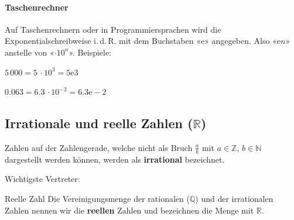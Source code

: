 

\paragraph{Taschenrechner} Auf Taschenrechnern oder in
Programmiersprachen wird die Exponentialschreibweise i.\,d.\,R. mit dem
Buchstaben «e» angegeben. Also «e$n$» anstelle von «$\cdot10^{n}$». Beispiele:

$5\,000 = 5\, \cdot 10^{3} = 5\mathrm{e}3$

$0.063 = 6.3\, \cdot 10^{-2} = 6.3\mathrm{e-}2$

\newpage

\subsection{Irrationale und reelle Zahlen ($\mathbb{R}$)}

  Zahlen auf der Zahlengerade, welche nicht als Bruch $\frac{a}{b}$ mit $a\in\mathbb{Z}$, $b \in \mathbb{N}$ dargestellt werden können, werden als \textbf{irrational} bezeichnet.

Wichtigste Vertreter:

\begin{center}
\end{center}

\begin{definition}{Reelle Zahl}{}
Die Vereinigungsmenge der rationalen ($\mathbb{Q}$) und der irrationalen Zahlen
nennen wir die \textbf{reellen} Zahlen und bezeichnen die Menge mit $\mathbb{R}$.
\end{definition}

